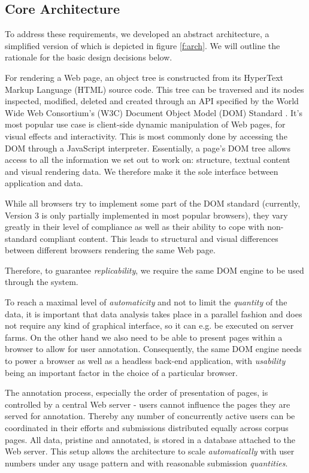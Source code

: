 \subsection{Core Architecture}

To address these requirements, we developed an abstract architecture, a simplified version of which is depicted in figure \ref{f:arch}.
We will outline the rationale for the basic design decisions below.


For rendering a Web page, an object tree is constructed from its HyperText Markup Language (HTML) source code.
This tree can be traversed and its nodes inspected, modified, deleted and created through an API specified by the World Wide Web Consortium's (W3C) Document Object Model (DOM) Standard \cite{dom}.
It's most popular use case is client-side dynamic manipulation of Web pages, for visual effects and interactivity.
This is most commonly done by accessing the DOM through a JavaScript interpreter.
Essentially, a page's DOM tree allows access to all the information we set out to work on: structure, textual content and visual rendering data.
We therefore make it the sole interface between application and data.

While all browsers try to implement some part of the DOM standard (currently, Version 3 is only partially implemented in most popular browsers), they vary greatly in their level of compliance as well as their ability to cope with non-standard compliant content.
This leads to structural and visual differences between different browsers rendering the same Web page.

Therefore, to guarantee \textit{replicability}, we require the same DOM engine to be used through the system.


To reach a maximal level of \textit{automaticity} and not to limit the \textit{quantity} of the data, it is important that data analysis takes place in a parallel fashion and does not require any kind of graphical interface, so it can e.g. be executed on server farms.
On the other hand we also need to be able to present pages within a browser to allow for user annotation.
Consequently, the same DOM engine needs to power a browser as well as a headless back-end application, with \textit{usability} being an important factor in the choice of a particular browser.


The annotation process, especially the order of presentation of pages, is controlled by a central Web server - users cannot influence the pages they are served for annotation.
Thereby any number of concurrently active users can be coordinated in their efforts and submissions distributed equally across corpus pages.
All data, pristine and annotated, is stored in a database attached to the Web server.
This setup allows the architecture to scale \textit{automatically} with user numbers under any usage pattern and with reasonable submission \textit{quantities}.



